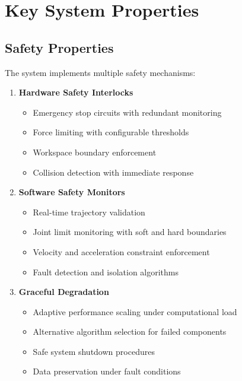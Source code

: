 \section{Key System Properties}
\label{sec:system_properties}

\subsection{Safety Properties}

The \rus{} system implements multiple safety mechanisms:

\begin{enumerate}
    \item \textbf{Hardware Safety Interlocks}
    \begin{itemize}
        \item Emergency stop circuits with redundant monitoring
        \item Force limiting with configurable thresholds
        \item Workspace boundary enforcement
        \item Collision detection with immediate response
    \end{itemize}
    
    \item \textbf{Software Safety Monitors}
    \begin{itemize}
        \item Real-time trajectory validation
        \item Joint limit monitoring with soft and hard boundaries
        \item Velocity and acceleration constraint enforcement
        \item Fault detection and isolation algorithms
    \end{itemize}
    
    \item \textbf{Graceful Degradation}
    \begin{itemize}
        \item Adaptive performance scaling under computational load
        \item Alternative algorithm selection for failed components
        \item Safe system shutdown procedures
        \item Data preservation under fault conditions
    \end{itemize}
\end{enumerate}

